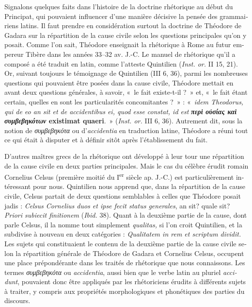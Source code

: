 \documentclass[french,output=paper,colorlinks,citecolor=brown]{../langscibook}
\begin{document}
\begin{otherlanguage}{french}
Signalons quelques faits dans l’histoire de la doctrine rhétorique au début du Principat, qui pouvaient influencer d’une manière décisive la pensée des grammairiens latins. Il faut prendre en considération surtout la doctrine de Théodore de Gadara sur la répartition de la cause civile selon les questions principales qu’on y posait. Comme l’on sait, Théodore enseignait la rhétorique à Rome au futur empereur Tibère dans les années 33–32 av. J.-C. Le manuel de rhétorique qu’il a composé a été traduit en latin, comme l’atteste Quintilien (\textit{Inst. or.} II 15, 21). Or, suivant toujours le témoignage de Quintilien (III 6, 36), parmi les nombreuses questions qui pouvaient être posées dans la cause civile, Théodore mettait en avant deux questions générales, à savoir, «~le fait existe-t-il ?~» et, «~le fait étant certain, quelles en sont les particularités concomitantes ?~» : «~\textit{idem Theodorus, qui de eo an sit et de accidentibus ei, quod esse constat, id est} \textbf{\textit{περὶ οὐσίας καὶ συμβεβηκότων} existimat quaeri}.~» (\textit{Inst. or.} III 6, 36). Autrement dit, sous la notion de \textit{συμβεβηκότα} ou d’\textit{accidentia} en traduction latine, Théodore a réuni tout ce qui était à disputer et à définir sitôt après l’établissement du fait.

D’autres maîtres grecs de la rhétorique ont développé à leur tour une répartition de la cause civile en deux parties principales. Mais le cas du célèbre érudit romain Cornelius Celsus (première moitié du I\textsuperscript{er} siècle ap. J.-C.) est particulièrement intéressant pour nous. Quintilien nous apprend que, dans la répartition de la cause civile, Celsus partait de deux questions semblables à celles que Théodore posait jadis : \textit{Celsus Cornelius duos et ipse fecit status generales}, an sit? quale sit? \textit{Priori subiecit finitionem} (\textit{Ibid.} 38). Quant à la deuxième partie de la cause, dont parle Celsus, il la nomme tout simplement \textit{qualitas,} si l’on croit Quintilien, et la subdivise à nouveau en deux catégories : \textit{Qualitatem in rem et scriptum dividit.} Les sujets qui constituaient le contenu de la deuxième partie de la cause civile selon la répartition générale de Théodore de Gadara et Cornelius Celsus, occupent une place prépondérante dans les traités de rhétorique que nous connaissons. Les termes \textit{συμβεβηκότα} ou \textit{accidentia}, aussi bien que le verbe latin au pluriel \textit{accidunt}, pouvaient donc être appliqués par les rhétoriciens érudits à différents sujets à traiter, y compris aux propriétés morphologiques et phonétiques des parties du discours.


\end{otherlanguage}
\end{document}
